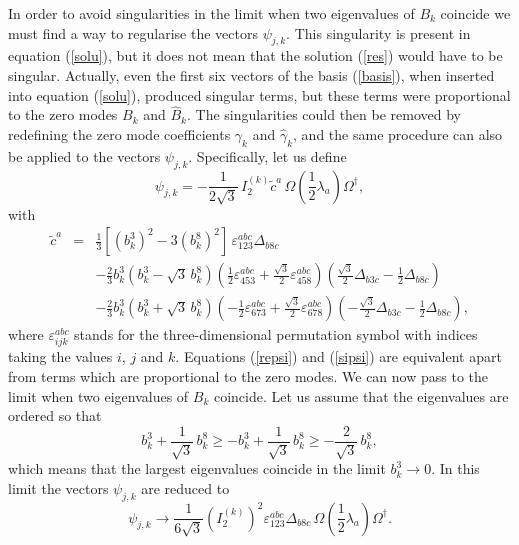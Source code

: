 \documentclass[a4paper,12pt]{article}
\begin{document}
In order to avoid singularities in the limit when two eigenvalues of $B_k$ coincide we must find a way to regularise the vectors $\psi_{j,k}$. This singularity is present in equation (\ref{solu}), but it does not mean that the solution (\ref{res}) would have to be singular. Actually, even the first six vectors of the basis (\ref{basis}), when inserted into equation (\ref{solu}), produced singular terms, but these terms were proportional to the zero modes $B_k$ and $\widehat{B}_k$. The singularities could then be removed by redefining the zero mode coefficients $\gamma_k$ and $\widehat{\gamma}_k$, and the same procedure can also be applied to the vectors $\psi_{j,k}$. Specifically, let us define
\begin{equation} \label{repsi}
\psi_{j,k} = - \frac{1}{2 \sqrt{3}} \, I_2^{(k)} \tilde{c}^a \, \Omega \! \left( \frac{1}{2} \lambda_a \right) \! \Omega^{\dagger},
\end{equation}
with
\begin{eqnarray*}
\tilde{c}^a &=& \frac{1}{3} [(b_k^3)^2 - 3(b_k^8)^2] \, \varepsilon_{123}^{abc} \Delta_{b8c} \\
 && -\frac{2}{3} b_k^3 (b_k^3 - \sqrt{3} \, b_k^8) \left( \frac{1}{2} \varepsilon_{453}^{abc} + \frac{\sqrt{3}}{2} \varepsilon_{458}^{abc} \right) \left( \frac{\sqrt{3}}{2} \Delta_{b3c} - \frac{1}{2} \Delta_{b8c} \right) \\
 && -\frac{2}{3} b_k^3 (b_k^3 + \sqrt{3} \, b_k^8) \left( -\frac{1}{2} \varepsilon_{673}^{abc} + \frac{\sqrt{3}}{2} \varepsilon_{678}^{abc} \right) \left( -\frac{\sqrt{3}}{2} \Delta_{b3c} - \frac{1}{2} \Delta_{b8c} \right),
\end{eqnarray*}
where $\varepsilon_{ijk}^{abc}$ stands for the three-dimensional permutation symbol with indices taking the values $i$, $j$ and $k$. Equations (\ref{repsi}) and (\ref{sipsi}) are equivalent apart from terms which are proportional to the zero modes. We can now pass to the limit when two eigenvalues of $B_k$ coincide. Let us assume that the eigenvalues are ordered so that
$$ b_k^3 + \frac{1}{\sqrt{3}} \, b_k^8 \geq -b_k^3 + \frac{1}{\sqrt{3}} \, b_k^8 \geq -\frac{2}{\sqrt{3}} \, b_k^8, $$
which means that the largest eigenvalues coincide in the limit $b_k^3 \rightarrow 0$. In this limit the vectors $\psi_{j,k}$ are reduced to
\begin{equation} \label{su2}
\psi_{j,k} \rightarrow \frac{1}{6 \sqrt{3}} \left( I_2^{(k)} \right)^2 \varepsilon_{123}^{abc} \Delta_{b8c} \, \Omega \! \left( \frac{1}{2} \lambda_a \right) \! \Omega^{\dagger}.
\end{equation}
\end{document}
